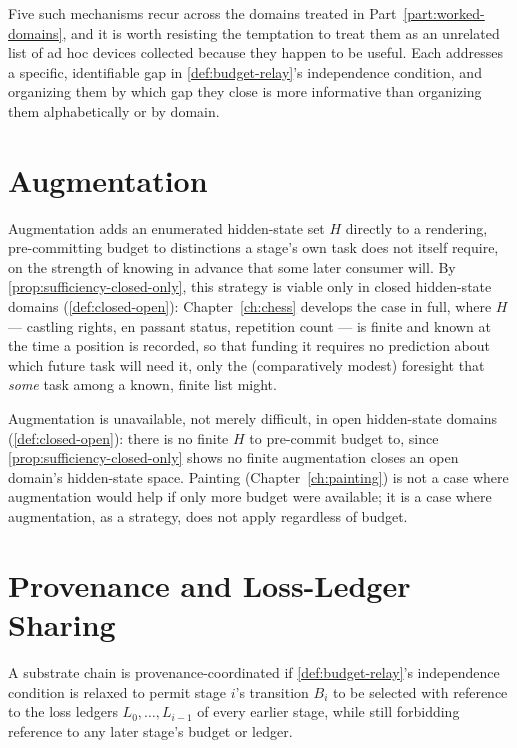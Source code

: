 Five such mechanisms recur across the domains treated in
Part~\ref{part:worked-domains}, and it is worth resisting the temptation
to treat them as an unrelated list of ad hoc devices collected because
they happen to be useful. Each addresses a specific, identifiable gap in
\cref{def:budget-relay}'s independence condition, and organizing them by
which gap they close is more informative than organizing them
alphabetically or by domain.

\section{Augmentation}
\label{sec:coord-augmentation}

Augmentation adds an enumerated hidden-state set $H$ directly to a
rendering, pre-committing budget to distinctions a stage's own task does
not itself require, on the strength of knowing in advance that some later
consumer will. By \cref{prop:sufficiency-closed-only}, this strategy is
viable only in closed hidden-state domains (\cref{def:closed-open}):
Chapter~\ref{ch:chess} develops the case in full, where $H$ --- castling
rights, en passant status, repetition count --- is finite and known at
the time a position is recorded, so that funding it requires no
prediction about which future task will need it, only the (comparatively
modest) foresight that \emph{some} task among a known, finite list might.

\begin{remark}
\label{rem:augmentation-limit}
Augmentation is unavailable, not merely difficult, in open hidden-state
domains (\cref{def:closed-open}): there is no finite $H$ to pre-commit
budget to, since \cref{prop:sufficiency-closed-only} shows no finite
augmentation closes an open domain's hidden-state space. Painting
(Chapter~\ref{ch:painting}) is not a case where augmentation would help
if only more budget were available; it is a case where augmentation, as a
strategy, does not apply regardless of budget.
\end{remark}

\section{Provenance and Loss-Ledger Sharing}
\label{sec:coord-provenance}

\begin{definition}
\label{def:provenance-coordinated}
A substrate chain is provenance-coordinated if \cref{def:budget-relay}'s
independence condition is relaxed to permit stage $i$'s transition $B_i$
to be selected with reference to the loss ledgers $L_0, \ldots, L_{i-1}$
of every earlier stage, while still forbidding reference to any later
stage's budget or ledger.
\end{definition}

